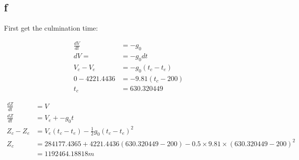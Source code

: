 \subsection*{f}

First get the culmination time:

\begin{equation}
    \begin{split}
        \frac{dV}{dt} &= -g_0  \\
        dV = &= -g_0 dt \\
        V_c - V_e &= -g_0(t_c - t_e) \\
        0 - 4221.4436 &= -9.81(t_c - 200) \\
        t_c &= 630.320449
    \end{split}
\end{equation}

\begin{equation}
    \begin{split}
        \frac{dZ}{dt} &= V \\
        \frac{dZ}{dt} &= V_e + -g_0t \\
        Z_c - Z_e &= V_e(t_c - t_e) -\frac{1}{2}g_0(t_c - t_e)^2 \\
        Z_c &= 284177.4365 + 4221.4436(630.320449-200) -0.5\times 9.81 \times (630.320449-200)^2 \\
        &= 1192464.18818 m
    \end{split}
\end{equation}

